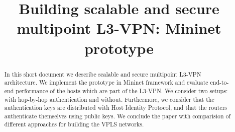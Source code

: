 \documentclass[conference,10pt,letter]{IEEEtran}
\begin{document}
\sloppy
\title{Building scalable and secure multipoint {{L3-VPN}}: Mininet prototype }
\maketitle
\begin{abstract}
In this short document we describe scalable and secure multipoint L3-VPN architecture.
We implement the prototype in Mininet framework and evaluate end-to-end 
performance of the hosts which are part of the L3-VPN. We consider two setups:
with hop-by-hop authentication and without. Furthermore, we consider that the
authentication keys are distributed with Host Identity Protocol, and that the 
routers authenticate themselves using public keys. We conclude the paper with 
comparision of different approaches for building the VPLS networks.
\end{abstract}



%


\end{document}
